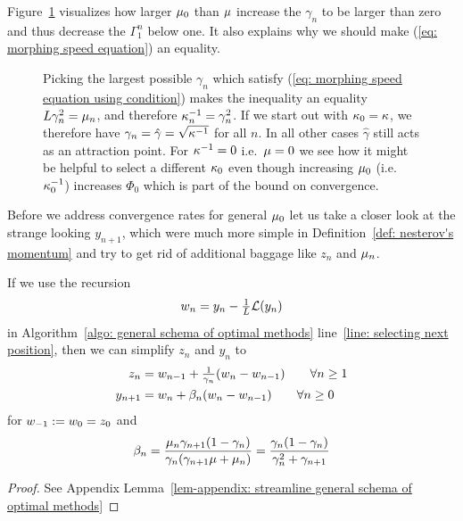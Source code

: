 %
Figure~\ref{fig: gamma path}
visualizes how larger \(\mu_0\) than \(\mu\) increase the \(\gamma_n\)
to be larger than zero and thus decrease the \(\Gamma_1^n\) below one. It also
explains why we should make (\ref{eq: morphing speed equation}) an equality.
%
\begin{figure}[h]
	\centering
	\def\svgwidth{1\textwidth}
	
	\caption{
		Picking the largest possible \(\gamma_n\) which satisfy (\ref{eq:
		morphing speed equation using condition}) makes the inequality an
		equality \(L \gamma_n^2 = \mu_n\),
		and therefore \(\kappa_n^{-1} = \gamma_n^2\).
		If we start out with \(\kappa_0=\kappa\), we therefore have
		\(\gamma_n=\hat{\gamma}=\sqrt{\kappa^{-1}}\) for all \(n\).
		In all other cases \(\hat{\gamma}\) still acts as an attraction point.
		For \(\kappa^{-1}=0\) i.e.\ \(\mu=0\)
		we see how it might be helpful to select a different \(\kappa_0\)
		even though increasing \(\mu_0\) (i.e.\ \(\kappa_0^{-1}\))
		increases \(\Phi_0\) which is part of the bound on convergence.
	}
	\label{fig: gamma path}
\end{figure}

Before we address convergence rates for general \(\mu_0\) let us take a
closer look at the strange looking \(y_{n+1}\), which were much more simple in
Definition~\ref{def: nesterov's momentum} and try to get rid of 
additional baggage like \(z_n\) and \(\mu_n\).

\begin{lemma}\label{lem: streamline general schema of optimal methods}
	If we use the recursion
	\begin{align}\label{eq-lem-assmpt: weigth recursion}
		w_n = y_n - \tfrac1{L}\mathcal{L}(y_n)
	\end{align}
	in Algorithm~\ref{algo: general schema of optimal methods} line~\ref{line:
	selecting next position}, then we can simplify \(z_n\) and \(y_n\)
	to
	\begin{align}
		z_n
		&= w_{n-1} + \tfrac1{\gamma_n}(w_n-w_{n-1})
		\qquad \forall n\ge 1\\
		y_{n+1}
		&=w_n + \beta_n(w_n-w_{n-1}) \qquad \forall n\ge 0
	\end{align}
	for \(w_{-1}:=w_0=z_0\) and
	\begin{align}
		\beta_n
		= \frac{\mu_n \gamma_{n+1}(1-\gamma_n)}{\gamma_n(\gamma_{n+1}\mu +\mu_n)}
		= \frac{\gamma_n(1-\gamma_n)}{\gamma_n^2 + \gamma_{n+1}}
	\end{align}
\end{lemma}
\begin{proof}
	See Appendix Lemma~\ref{lem-appendix: streamline general schema of optimal methods}
\end{proof}

